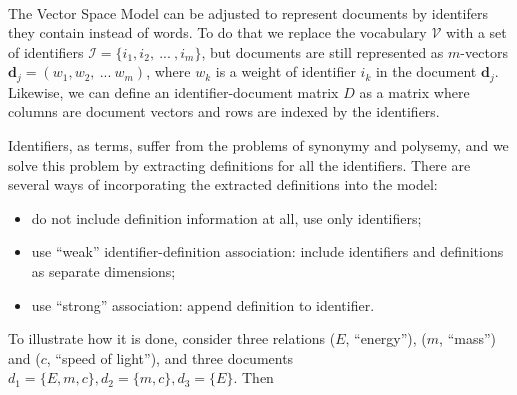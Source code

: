 \ \\


The Vector Space Model can be adjusted to represent documents by identifers 
they contain instead of words. To do that we replace the vocabulary $\mathcal V$ 
with  a set of identifiers $\mathcal I = \{ i_1, i_2, \ ... \ , i_m \}$, 
but documents are still represented as $m$-vectors $\mathbf d_j = (w_1, w_2, \ ... \ w_m)$, 
where $w_k$ is a weight of identifier $i_k$ in the document $\mathbf d_j$. 
Likewise, we can define an identifier-document matrix $D$ as a matrix where
columns are document vectors and rows are indexed by the identifiers. 

Identifiers, as terms, suffer from the problems of synonymy and polysemy, 
and we solve this problem by extracting definitions for all the identifiers. 
There are several ways of incorporating the extracted definitions into the 
model:

\begin{itemize}
\itemsep1pt\parskip0pt
  \item do not include definition information at all, use only identifiers; 
  \item use ``weak'' identifier-definition association: include identifiers and
        definitions as separate dimensions;
  \item use ``strong'' association: append definition to identifier.
\end{itemize}

To illustrate how it is done, consider three relations ($E$, ``energy''), 
($m$, ``mass'') and ($c$, ``speed of light''), and three documents 
$d_1 = \{E, m, c\}, d_2 = \{ m, c\}, d_3 = \{ E \}$. Then 

